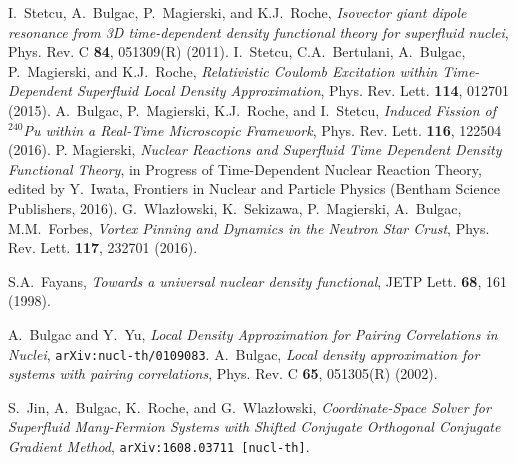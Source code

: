 \documentclass{PoS}
\begin{document}
\begin{thebibliography}{99}
I.~Stetcu, A.~Bulgac, P.~Magierski, and K.J.~Roche,
\emph{Isovector giant dipole resonance from 3D time-dependent density functional theory for superfluid nuclei},
Phys. Rev. C \textbf{84}, 051309(R) (2011).
I.~Stetcu, C.A.~Bertulani, A.~Bulgac, P.~Magierski, and K.J.~Roche,
\emph{Relativistic Coulomb Excitation within Time-Dependent Superfluid Local Density Approximation},
Phys. Rev. Lett. \textbf{114}, 012701 (2015).
A.~Bulgac, P.~Magierski, K.J.~Roche, and I.~Stetcu,
\emph{Induced Fission of $^\mathit{240}$Pu within a Real-Time Microscopic Framework},
Phys. Rev. Lett. \textbf{116}, 122504 (2016).
P. Magierski,
\emph{Nuclear Reactions and Superfluid Time Dependent Density Functional Theory},
in Progress of Time-Dependent Nuclear Reaction Theory,
edited by Y.~Iwata, Frontiers in Nuclear and Particle Physics (Bentham Science Publishers, 2016).
G.~Wlaz{\l}owski, K.~Sekizawa, P.~Magierski, A.~Bulgac, M.M.~Forbes,
\emph{Vortex Pinning and Dynamics in the Neutron Star Crust},
Phys. Rev. Lett. \textbf{117}, 232701 (2016).

S.A.~Fayans,
\emph{Towards a universal nuclear density functional},
JETP Lett. \textbf{68}, 161 (1998).

A.~Bulgac and Y.~Yu,
\emph{Local Density Approximation for Pairing Correlations in Nuclei},
{\tt arXiv:nucl-th/0109083}.
A.~Bulgac,
\emph{Local density approximation for systems with pairing correlations},
Phys. Rev. C \textbf{65}, 051305(R) (2002).

S.~Jin, A.~Bulgac, K.~Roche, and G.~Wlaz{\l}owski,
\emph{Coordinate-Space Solver for Superfluid Many-Fermion Systems with Shifted Conjugate Orthogonal Conjugate Gradient Method},
{\tt arXiv:1608.03711 [nucl-th]}.


\end{thebibliography}
\end{document}
